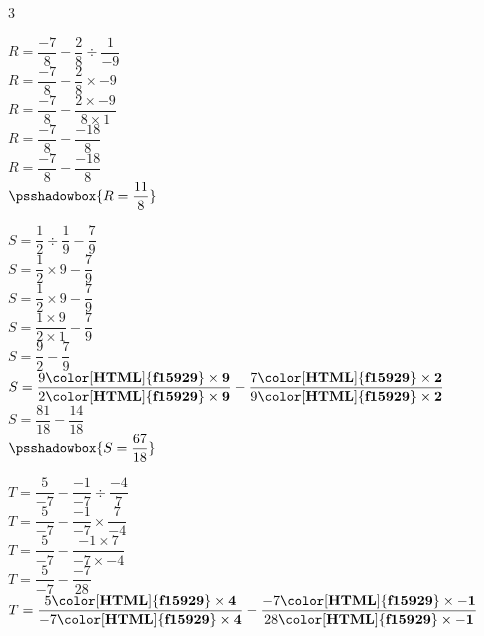 \begin{corrige}
    \phantom{rrr}    
    \begin{multicols}3
        \begin{list}{}{}
            \begin{spacing}{2}
                \item 
                $R = \dfrac{-7}{8} - \dfrac{2}{8}  \div  \dfrac{1}{-9}$ \\
                $R = \dfrac{-7}{8} - \dfrac{2}{8} \times -9$ \\
                $R = \dfrac{-7}{8} - \dfrac{2\times-9}{8\times1}$ \\
                $R = \dfrac{-7}{8} - \dfrac{-18}{8}$ \\
                $R = \dfrac{-7}{8} - \dfrac{-18}{8}$ \\
                $\psshadowbox{R = \dfrac{11}{8}}$
                \item 
                $S = \dfrac{1}{2}  \div  \dfrac{1}{9} - \dfrac{7}{9}$ \\
                $S = \dfrac{1}{2} \times 9 - \dfrac{7}{9}$ \\
                $S = \dfrac{1}{2}\times 9 - \dfrac{7}{9}$ \\
                $S = \dfrac{1\times9}{2\times1} - \dfrac{7}{9}$ \\
                $S = \dfrac{9}{2} - \dfrac{7}{9}$ \\
                $S = \dfrac{9\mathbf{{\color[HTML]{f15929}\times9}}}{2\mathbf{{\color[HTML]{f15929}\times9}}} - \dfrac{7\mathbf{{\color[HTML]{f15929}\times2}}}{9\mathbf{{\color[HTML]{f15929}\times2}}}$ \\
                $S = \dfrac{81}{18} - \dfrac{14}{18}$ \\
                $\psshadowbox{S = \dfrac{67}{18}}$
                \columnbreak
                \item 
                $T = \dfrac{5}{-7} - \dfrac{-1}{-7}  \div  \dfrac{-4}{7}$ \\
                $T = \dfrac{5}{-7} - \dfrac{-1}{-7} \times \dfrac{7}{-4}$ \\
                $T = \dfrac{5}{-7} - \dfrac{-1\times7}{-7\times-4}$ \\
                $T = \dfrac{5}{-7} - \dfrac{-7}{28}$ \\
                $T = \dfrac{5\mathbf{{\color[HTML]{f15929}\times4}}}{-7\mathbf{{\color[HTML]{f15929}\times4}}} - \dfrac{-7\mathbf{{\color[HTML]{f15929}\times-1}}}{28\mathbf{{\color[HTML]{f15929}\times-1}}}$ \\

\end{spacing}
\end{list}
\end{multicols}
\end{corrige}
